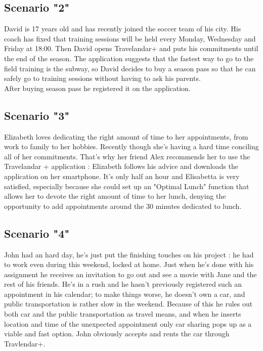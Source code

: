 \subsection{Scenario "2"}

David is 17 years old and has recently joined the soccer team of his city. His coach has fixed that training sessions will be held every Monday, Wednesday and Friday at 18:00. Then David opens Travelandar+ and puts his commitments until the end of the season. The application suggests that the fastest way to go to the field training is the subway, so David decides to buy a season pass so that he can safely go to training sessions without having to ask his parents.\\
After buying season pass he registered it on the application.


\subsection{Scenario "3"}

Elizabeth loves dedicating the right amount of time to her appointments, from work to family to her hobbies. Recently though she’s having a hard time conciling all of her commitments. 
That’s why her friend Alex recommends her to use the Travelandar + application : Elizabeth follows his advice and downloads the application on her smartphone. 
It’s only half an hour and Elisabetta is very satisfied, especially because she could set up an "Optimal Lunch" function that allows her to devote the right amount of time to her lunch, denying the opportunity to add appointments around the 30 minutes dedicated to lunch.

\subsection {Scenario "4"}
John had an hard day, he’s just put the finishing touches on his project : he had to work even during this weekend, locked at home. Just when he’s done with his assignment he receives an invitation to go out and see a movie with Jane and the rest of his friends. 
He’s in a rush and he hasn’t previously registered such an appointment in his calendar; to make things worse, he doesn’t own a car, and public transportation is rather slow in the weekend. Because of this he rules out both car and the public transportation as travel means, and when he inserts location and time of the unexpected appointment only car sharing pops up as a viable and fast option. 
John obviously accepts and rents the car through Travlendar+. 


